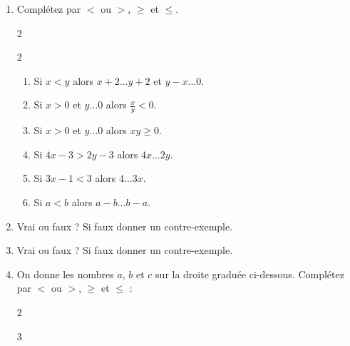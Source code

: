 \documentclass[main.tex]{subfiles}
\begin{document}
\begin{exercise}\hfill 
\begin{enumerate}[label={\arabic*)}, leftmargin=*]
\item Complétez par $<$ ou $>$, $\geqslant$ et $\leqslant$.\vspace{-1em}
	\begin{spacing}{2}
	\begin{multicols}{2}
		\begin{enumerate}[label={}, leftmargin=*]
			\item Si $x<y$ alors $x+2 \ldots y+2$ et $y-x \ldots 0$.
			\item Si $x>0$ et $y\ldots 0$ alors $\frac{x}{y}<0$.
			\item Si $x>0$ et $y\ldots 0$ alors $xy\geqslant 0$.
			\item Si $4x-3>2y-3$ alors $4x\ldots 2y$.
			\item Si $3x-1<3$ alors $4 \ldots 3x$.
			\item Si $a<b$ alors $a-b \ldots b-a$.
		\end{enumerate}
	\end{multicols}
	\end{spacing}\vspace{-1em}
\item Vrai ou faux ? Si faux donner un contre-exemple.\\
\noindent{} 
\item Vrai ou faux ? Si faux donner un contre-exemple.\\
\noindent{} 
\item On donne les nombres $a$, $b$ et $c$ sur la droite graduée ci-dessous. Complétez par $<$ ou $>$, $\geqslant$ et $\leqslant$ :
\vspace{-1em}
\begin{spacing}{2}
	\begin{multicols}{3}
		\begin{enumerate}[label={}, leftmargin=*]

\end{enumerate}
\end{multicols}
\end{spacing}
\end{enumerate}
\end{exercise}
\end{document}
